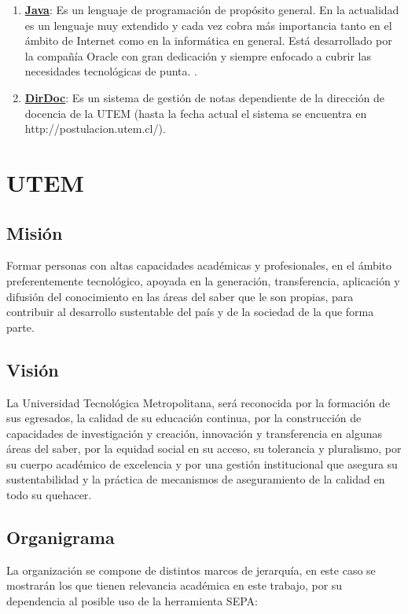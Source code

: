 \documentclass[a4paper,12pt,openany,oneside]{book}
\begin{document}
\begin{enumerate}
	\item \textbf{\underline{Java}}: Es un lenguaje de programación de propósito general. En la actualidad es un lenguaje muy extendido y cada vez cobra más importancia tanto en el ámbito de Internet como en la informática en general. Está desarrollado por la compañía Oracle con gran dedicación y siempre enfocado a cubrir las necesidades tecnológicas de punta. \cite{data10}.
	\item \textbf{\underline{DirDoc}}: Es un sistema de gestión de notas dependiente de la dirección de docencia de la UTEM (hasta la fecha actual el sistema se encuentra en http://postulacion.utem.cl/).
\end{enumerate}
\chapter{UTEM}
\thispagestyle{empty}
\section{Misión}
Formar personas con altas capacidades académicas y profesionales, en el ámbito preferentemente tecnológico, apoyada en la generación, transferencia, aplicación y difusión del conocimiento en las áreas del saber que le son propias, para contribuir al desarrollo sustentable del país y de la sociedad de la que forma parte.
\section{Visión}
La Universidad Tecnológica Metropolitana, será reconocida por la formación de sus egresados, la calidad de su educación continua, por la construcción de capacidades de investigación y creación, innovación y transferencia en algunas áreas del saber, por la equidad social en su acceso, su tolerancia y pluralismo, por su cuerpo académico de excelencia y por una gestión institucional que asegura su sustentabilidad y la práctica de mecanismos de aseguramiento de la calidad en todo su quehacer.
\section{Organigrama}
La organización se compone de distintos marcos de jerarquía, en este caso se mostrarán los que tienen relevancia académica en este trabajo, por su dependencia al posible uso de la herramienta SEPA:
\end{document}
